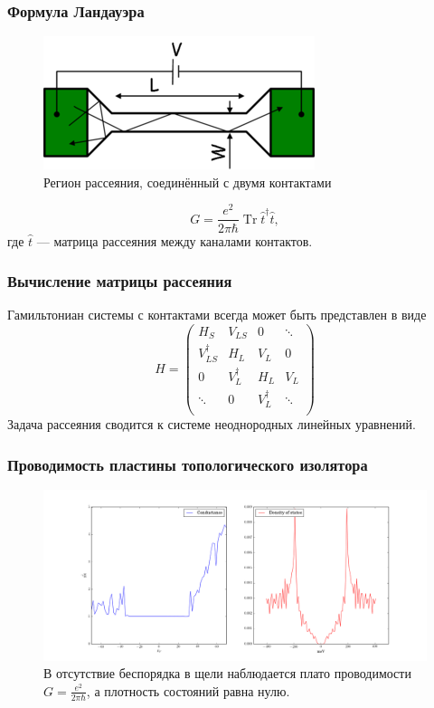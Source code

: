 \documentclass{beamer}
\DeclareMathOperator{\Tr}{Tr}
\begin{document}
\begin{frame}
    \frametitle{Формула Ландауэра}
    \begin{figure}[h]
        \centering
        \includegraphics[width=0.7\linewidth]{scattering.png}
        \caption{Регион рассеяния, соединённый с двумя контактами}
    \end{figure}
    \begin{equation}
        G = \frac{e^2}{2\pi \hbar} \Tr{\hat{t}^\dagger \hat{t}},
    \end{equation}
    где $\hat{t}$ --- матрица рассеяния между каналами контактов.
\end{frame}

\begin{frame}
    \frametitle{Вычисление матрицы рассеяния}
    Гамильтониан системы с контактами всегда может быть представлен в виде
    \begin{equation}
        H = \begin{pmatrix}
                H_S             & V_{LS}     & 0           & \ddots \\
                V_{LS}^\dagger  & H_L        & V_L         & 0  \\
                0               & V_L^\dagger& H_L         & V_L    \\
                \ddots          & 0          & V_L^\dagger & \ddots \\
            \end{pmatrix}
    \end{equation}
    Задача рассеяния сводится к системе неоднородных линейных уравнений.
\end{frame}

\begin{frame}
    \frametitle{Проводимость пластины топологического изолятора}
    \begin{figure}[h]
        \centering
        \includegraphics[width=0.9\linewidth]{cond_and_density/dis_000.png}
        \caption{В отсутствие беспорядка 
                 в щели наблюдается плато проводимости $G = \frac{e^2}{2\pi\hbar}$, 
                 а плотность состояний равна нулю. 
                 }
    \end{figure}
\end{frame}
\end{document}

